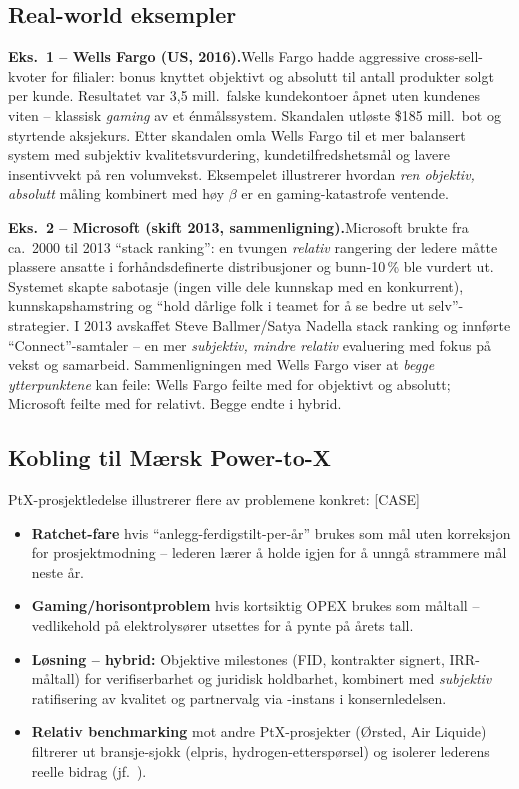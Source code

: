 \subsection*{Real-world eksempler}

\textbf{Eks.~1 -- Wells Fargo (US, 2016).}\quad [EKS]
Wells Fargo hadde aggressive cross-sell-kvoter for filialer: bonus knyttet objektivt og absolutt til antall produkter solgt per kunde. Resultatet var 3{,}5 mill.\ falske kundekontoer åpnet uten kundenes viten -- klassisk \emph{gaming} av et énmålssystem. Skandalen utløste \$185 mill.\ bot og styrtende aksjekurs. Etter skandalen omla Wells Fargo til et mer balansert system med subjektiv kvalitetsvurdering, kundetilfredshetsmål og lavere insentivvekt på ren volumvekst. Eksempelet illustrerer hvordan \emph{ren objektiv, absolutt} måling kombinert med høy $\beta$ er en gaming-katastrofe ventende.

\textbf{Eks.~2 -- Microsoft (skift 2013, sammenligning).}\quad [EKS]
Microsoft brukte fra ca.\ 2000 til 2013 ``stack ranking'': en tvungen \emph{relativ} rangering der ledere måtte plassere ansatte i forhåndsdefinerte distribusjoner og bunn-10\,\% ble vurdert ut. Systemet skapte sabotasje (ingen ville dele kunnskap med en konkurrent), kunnskapshamstring og ``hold dårlige folk i teamet for å se bedre ut selv''-strategier. I 2013 avskaffet Steve Ballmer/Satya Nadella stack ranking og innførte ``Connect''-samtaler -- en mer \emph{subjektiv, mindre relativ} evaluering med fokus på vekst og samarbeid. Sammenligningen med Wells Fargo viser at \emph{begge ytterpunktene} kan feile: Wells Fargo feilte med for objektivt og absolutt; Microsoft feilte med for relativt. Begge endte i hybrid.

\subsection*{Kobling til Mærsk Power-to-X}
PtX-prosjektledelse illustrerer flere av problemene konkret: [CASE]
\begin{itemize}\setlength{\itemsep}{2pt}
\item \textbf{Ratchet-fare} hvis ``anlegg-ferdigstilt-per-år'' brukes som mål uten korreksjon for prosjektmodning -- lederen lærer å holde igjen for å unngå strammere mål neste år.
\item \textbf{Gaming/horisontproblem} hvis kortsiktig OPEX brukes som måltall -- vedlikehold på elektrolysører utsettes for å pynte på årets tall.
\item \textbf{Løsning -- hybrid:} Objektive milestones (FID, kontrakter signert, IRR-måltall) for verifiserbarhet og juridisk holdbarhet, kombinert med \emph{subjektiv} ratifisering av kvalitet og partnervalg via -instans i konsernledelsen.
\item \textbf{Relativ benchmarking} mot andre PtX-prosjekter (Ørsted, Air Liquide) filtrerer ut bransje-sjokk (elpris, hydrogen-etterspørsel) og isolerer lederens reelle bidrag (jf.\ ).
\end{itemize}

